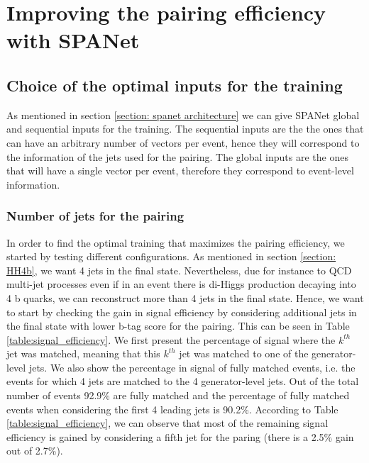 \section{Improving the pairing efficiency with SPANet} \label{section: improving}



\subsection{Choice of the optimal inputs for the training} \label{subsection: choice of inputs}

As mentioned in section \ref{section: spanet architecture} we can give SPANet global and sequential inputs for the training. The sequential inputs are the the ones that can have an arbitrary number of vectors per event, hence they will correspond to the information of the jets used for the pairing. The global inputs are the ones that will have a single vector per event, therefore they correspond to event-level information.

\subsubsection{Number of jets for the pairing}

In order to find the optimal training that maximizes the pairing efficiency, we started by testing different configurations. As mentioned in section \ref{section: HH4b}, we want 4 jets in the final state. Nevertheless, due for instance to QCD multi-jet processes even if in an event there is di-Higgs production decaying into 4 b quarks, we can reconstruct more than 4 jets in the final state. Hence, we want to start by checking the gain in signal efficiency by considering additional jets in the final state with lower b-tag score for the pairing. This can be seen in Table \ref{table:signal_efficiency}. We first present the percentage of signal where the $k^{th}$ jet was matched, meaning that this $k^{th}$ jet was matched to one of the generator-level jets. We also show the percentage in signal of fully matched events, i.e. the events for which 4 jets are matched to the 4 generator-level jets. Out of the total number of events 92.9\% are fully matched and the percentage of fully matched events when considering the first 4 leading jets is 90.2\%. According to Table \ref{table:signal_efficiency}, we can observe that most of the remaining signal efficiency is gained by considering a fifth jet for the paring (there is a 2.5\% gain out of 2.7\%). 

